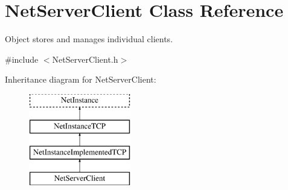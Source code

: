 \hypertarget{class_net_server_client}{
\section{NetServerClient Class Reference}
\label{class_net_server_client}
}


Object stores and manages individual clients.  




{\ttfamily \#include $<$NetServerClient.h$>$}

Inheritance diagram for NetServerClient:\begin{figure}[H]
\begin{center}
\leavevmode
\includegraphics[height=4.000000cm]{class_net_server_client}
\end{center}
\end{figure}
